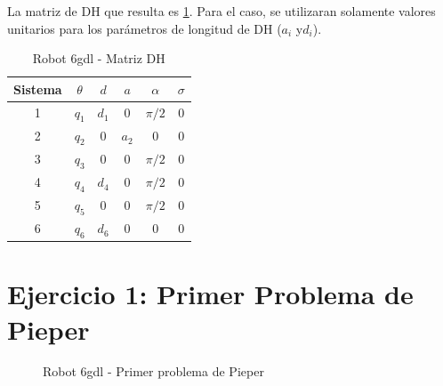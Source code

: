 \documentclass[a4paper,12pt]{article}
\begin{document}
La matriz de DH que resulta es \cref{matriz DH}. Para el caso, se utilizaran solamente
valores unitarios para los parámetros de longitud de DH ($a_i$ y$d_i$).

\begin{table}[H]
    \centering
    \begin{tabular}{|c|c|c|c|c|c|}
    \hline
    Sistema & $\theta$  & $d$        & $a$    & $\alpha$  & $\sigma$ \\ \hline
    1       & $q_1$     & $d_1$      & $0$    & $\pi/2$   & 0        \\ \hline
    2       & $q_2$     & $0$        & $a_2$  & $0$       & 0        \\ \hline
    3       & $q_3$     & $0$        & $0$    & $\pi/2$   & 0        \\ \hline
    4       & $q_4$     & $d_4$      & $0$    & $\pi/2$   & 0        \\ \hline
    5       & $q_5$     & $0$        & $0$    & $\pi/2$   & 0        \\ \hline
    6       & $q_6$     & $d_6$      & $0$    & $0$       & 0        \\ \hline
    \end{tabular}
    \caption{Robot 6gdl - Matriz DH}
    \label{matriz DH}
\end{table}

\section{Ejercicio 1: Primer Problema de Pieper}
\begin{figure}[H]
    \centering
    \begin{adjustbox}{scale = 0.55, max width=\columnwidth}
    \end{adjustbox}
    \caption{Robot 6gdl - Primer problema de Pieper}
\end{figure}
\end{document}
